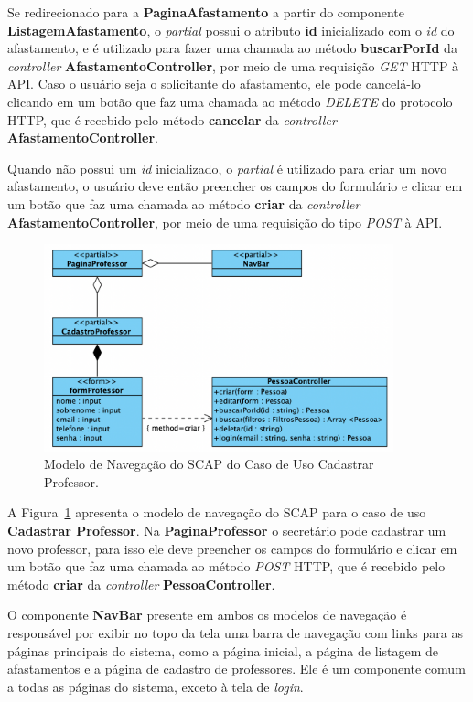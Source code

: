 Se redirecionado para a \textbf{PaginaAfastamento} a partir do componente \textbf{ListagemAfastamento},
o \textit{partial} possui o atributo \textbf{id} inicializado com o \textit{id} do afastamento, e é
utilizado para fazer uma chamada ao método \textbf{buscarPorId} da \textit{controller} \textbf{AfastamentoController}, por
meio de uma requisição \textit{GET} HTTP à API.
Caso o usuário seja o solicitante do afastamento, ele pode cancelá-lo clicando em um botão que faz uma chamada ao método \textit{DELETE}
do protocolo HTTP, que é recebido pelo método \textbf{cancelar} da \textit{controller} \textbf{AfastamentoController}.

Quando não possui um \textit{id} inicializado, o \textit{partial} é utilizado para criar um novo afastamento,
o usuário deve então preencher os campos do formulário e clicar em um botão que faz uma chamada ao método
\textbf{criar} da \textit{controller} \textbf{AfastamentoController}, por meio de uma requisição do tipo \textit{POST} à API.


\begin{figure}
    \centering
    \includegraphics[width=0.9\textwidth]{figuras/fig-modelo-naveg-cadast.png}
    \caption{Modelo de Navegação do SCAP do Caso de Uso Cadastrar Professor.}
    \label{fig-modelo-navegacao-professor}
\end{figure}

A Figura~\ref{fig-modelo-navegacao-professor} apresenta o modelo de navegação do SCAP para o caso de uso
\textbf{Cadastrar Professor}. Na \textbf{PaginaProfessor} o secretário pode cadastrar um novo professor,
para isso ele deve preencher os campos do formulário e clicar em um botão que faz uma chamada ao método \textit{POST} HTTP,
que é recebido pelo método \textbf{criar} da \textit{controller} \textbf{PessoaController}.

O componente \textbf{NavBar} presente em ambos os modelos de navegação é responsável por exibir
no topo da tela uma barra de navegação com links para as páginas principais do sistema, como a página inicial,
a página de listagem de afastamentos e a página de cadastro de professores. Ele é um componente
comum a todas as páginas do sistema, exceto à tela de \textit{login}.

